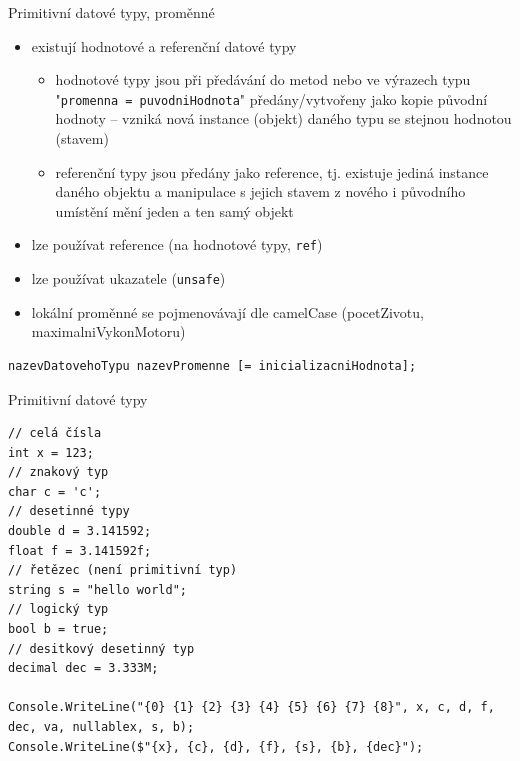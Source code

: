 \begin{frame}[fragile]
\vfill
\begin{block}{Primitivní datové typy, proměnné}
\begin{itemize}
\item existují hodnotové a referenční datové typy
\begin{itemize}
\item hodnotové typy jsou při předávání do metod nebo ve výrazech typu "\lstinline|promenna = puvodniHodnota|" předány/vytvořeny jako kopie původní hodnoty -- vzniká nová instance (objekt) daného typu se stejnou hodnotou (stavem)
\item referenční typy jsou předány jako reference, tj. existuje jediná instance daného objektu a manipulace s jejich stavem z nového i původního umístění mění jeden a ten samý objekt
\end{itemize}

\item lze používat reference (na hodnotové typy, \lstinline|ref|)
\item lze používat ukazatele (\lstinline|unsafe|)
\item lokální proměnné se pojmenovávají dle camelCase (pocetZivotu, maximalniVykonMotoru)
\end{itemize}
\end{block}
\vfill
\begin{noteblock}{}
\begin{lstlisting}
nazevDatovehoTypu nazevPromenne [= inicializacniHodnota];
\end{lstlisting}
\end{noteblock}
\vfill
\end{frame}




\begin{frame}[fragile]
\begin{exampleblock}{Primitivní datové typy}
\begin{lstlisting}
// celá čísla
int x = 123;
// znakový typ
char c = 'c';
// desetinné typy
double d = 3.141592;
float f = 3.141592f;
// řetězec (není primitivní typ)
string s = "hello world";
// logický typ
bool b = true;
// desitkový desetinný typ
decimal dec = 3.333M;
           
Console.WriteLine("{0} {1} {2} {3} {4} {5} {6} {7} {8}", x, c, d, f, dec, va, nullablex, s, b);
Console.WriteLine($"{x}, {c}, {d}, {f}, {s}, {b}, {dec}");
\end{lstlisting}
\end{exampleblock}
\end{frame}

